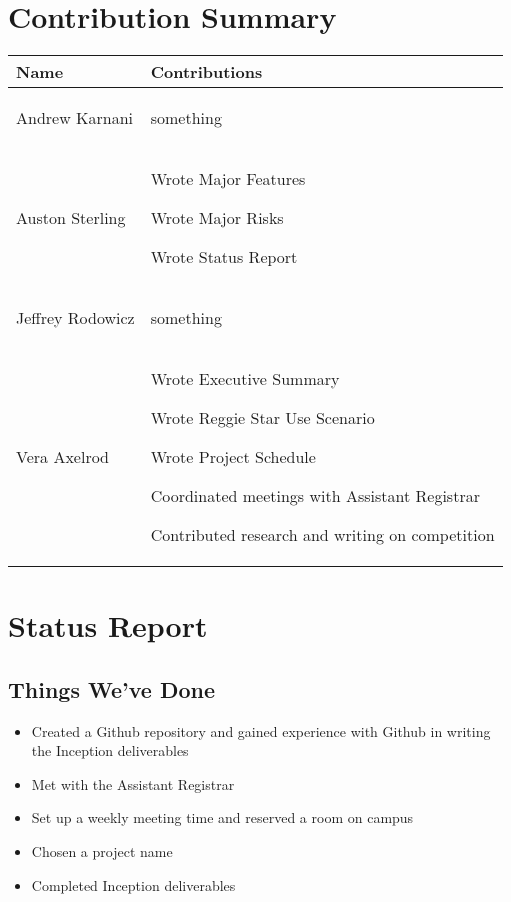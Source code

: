 \documentclass[11pt]{article}
\newenvironment{packed_itemize}{
\begin{itemize}
  \setlength{\itemsep}{1pt}
  \setlength{\parskip}{0pt}
  \setlength{\parsep}{0pt}
}{\end{itemize}}
\begin{document}
\section{Contribution Summary} %
\begin{tabular}{|m{1.4in}|m{4in}|}
\hline
\textbf{\large Name}     & \textbf{\large Contributions} \\
\hline\hline
 Andrew Karnani
	&
	 \begin{packed_itemize}
		\item something
	\end{packed_itemize}
\\
\hline
 Auston Sterling
	&
	 \begin{packed_itemize}
	        \item Wrote Major Features
                \item Wrote Major Risks
                \item Wrote Status Report
	\end{packed_itemize}
\\
\hline
Jeffrey Rodowicz
	&
	 \begin{packed_itemize}
		\item something
	\end{packed_itemize}
\\
\hline
Vera Axelrod
	&
	 \begin{packed_itemize}
		\item Wrote Executive Summary
		\item Wrote Reggie Star Use Scenario
		\item Wrote Project Schedule
		\item Coordinated meetings with Assistant Registrar
		\item Contributed research  and writing on competition
	\end{packed_itemize}
\\
\hline
\end{tabular}


\section{Status Report} %
\subsection{Things We've Done}
\begin{itemize}
\item Created a Github repository and gained experience with Github in writing the Inception deliverables
\item Met with the Assistant Registrar
\item Set up a weekly meeting time and reserved a room on campus
\item Chosen a project name
\item Completed Inception deliverables
\end{itemize}
\end{document}
